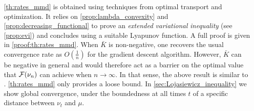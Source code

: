 \cref{th:rates_mmd} is obtained using techniques from optimal transport and optimization. It relies on \cref{prop:lambda_convexity} and \cref{prop:decreasing_functional} to prove an \textit{extended variational inequality} (see \cref{prop:evi}) and concludes using a suitable Lyapunov function. A full proof is given in \cref{proof:th:rates_mmd}.
When $\bar{K}$ is non-negative, one recovers the usual convergence rate as $O(\frac{1}{n})$ for the gradient descent algorithm. However, $\bar{K}$ can be negative in general and would therefore act as a barrier on the optimal value that ${{\mathcal F}}(\nu_n)$ can achieve when $n\rightarrow \infty$. In that sense, the above result is similar to \cite[Theorem 6.9]{Bottou:2017}.
%
 \cref{th:rates_mmd} only provides a loose bound. In \cref{sec:Lojasiewicz_inequality} we show global convergence, under the boundedness at all times $t$ of a specific distance between $\nu_t$ and $\mu$.



